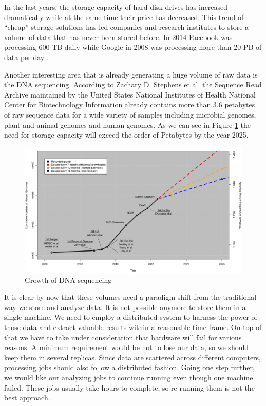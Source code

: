In the last years, the storage capacity of hard disk drives has
increased dramatically while at the same time their price has
decreased. This trend of ``cheap'' storage solutions has led companies and research
institutes to store a volume of data that has never been stored
before. In 2014 Facebook was processing 600 TB daily
\cite{facebook_data}
while Google in 2008 was processing more than 20 PB of data per day
\cite{Dean:2008:MSD:1327452.1327492}.


Another interesting area that is already generating a huge volume of
raw data is the DNA sequencing. According to Zachary D. Stephens et
al. \cite{10.1371/journal.pbio.1002195} the Sequence
Read Archive maintained by the United States National Institutes of Health
National Center for Biotechnology Information already contains more
than 3.6 petabytes of raw sequence data for a wide variety of samples
including microbial genomes, plant and animal genomes and human
genomes. As we can see in Figure \ref{fig:intro_genomics_growth} the
need for storage capacity will exceed the order of Petabytes by the
year 2025.

\begin{figure}
\centering
\includegraphics[scale=0.5]{resources/images/Introduction/genomics_growth.png}
\caption{Growth of DNA sequencing \cite{10.1371/journal.pbio.1002195}}
\label{fig:intro_genomics_growth}
\end{figure}

It is clear by now that these volumes need a paradigm shift
from the traditional way we store and analyze data. It is not possible
anymore to store them in a single machine. We need to employ a
distributed system to harness the power of those data and extract
valuable results within a reasonable time frame. On top of that we have
to take under consideration that hardware will fail for various
reasons. A minimum requirement would be not to lose our data, so we
should keep them in several replicas. Since data are scattered across
different computers, processing jobs should also follow a
distributed fashion. Going one step further, we would
like our analyzing jobs to continue running even though one machine failed. These
jobs usually take hours to complete, so re-running them is not the
best approach.
